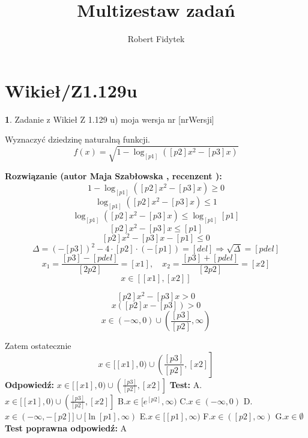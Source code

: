 \documentclass[12pt, a4paper]{article}
\title{Multizestaw zadań}
\author{Robert Fidytek}
\date{}
\theoremstyle{definition} %
\newtheorem{zad}{}
\newcommand{\kategoria}[1]{\section{#1}} %
\newcommand{\zadStart}[1]{\begin{zad}#1\newline} %
\newcommand{\zadStop}{\end{zad}}   %
\newcommand{\rozwStart}[2]{\noindent \textbf{Rozwiązanie (autor #1 , recenzent #2): }\newline} %
\newcommand{\rozwStop}{\newline}                                            %
\newcommand{\odpStart}{\noindent \textbf{Odpowiedź:}\newline}    %
\newcommand{\odpStop}{\newline}                                             %
\newcommand{\testStart}{\noindent \textbf{Test:}\newline} %
\newcommand{\testStop}{\newline} %
\newcommand{\kluczStart}{\noindent \textbf{Test poprawna odpowiedź:}\newline} %
\newcommand{\kluczStop}{\newline} %
\begin{document}
\maketitle


\kategoria{Wikieł/Z1.129u}
\zadStart{Zadanie z Wikieł Z 1.129 u) moja wersja nr [nrWersji]}

Wyznaczyć dziedzinę naturalną funkcji.
$$f(x)=\sqrt{1-\log_{[p1]}([p2]x^{2}-[p3]x)}$$
\zadStop

\rozwStart{Maja Szabłowska}{}
$$1-\log_{[p1]}([p2]x^{2}-[p3]x)\geq0$$
$$\log_{[p1]}([p2]x^{2}-[p3]x)\leq1$$
$$\log_{[p1]}([p2]x^{2}-[p3]x)\leq\log_{[p1]}[p1]$$
$$[p2]x^{2}-[p3]x\leq[p1]$$
$$[p2]x^{2}-[p3]x-[p1]\leq0$$
$$\Delta=(-[p3])^{2}-4\cdot[p2]\cdot(-[p1])=[del] \Rightarrow \sqrt{\Delta}=[pdel]$$
$$x_{1}=\frac{[p3]-[pdel]}{[2p2]}=[x1], \quad x_{2}=\frac{[p3]+[pdel]}{[2p2]}=[x2]$$
$$x\in[[x1],[x2]]$$

$$[p2]x^{2}-[p3]x>0$$
$$x([p2]x-[p3])>0$$
$$x\in\left(-\infty,0\right)\cup\left(\frac{[p3]}{[p2]},\infty\right)$$

Zatem ostatecznie
$$x\in[[x1],0)\cup\left(\frac{[p3]}{[p2]},[x2]\right]$$
\rozwStop
\odpStart
$x\in[[x1],0)\cup\left(\frac{[p3]}{[p2]},[x2]\right]$
\odpStop
\testStart
A.$x\in[[x1],0)\cup\left(\frac{[p3]}{[p2]},[x2]\right]$
B.$x\in[e^{[p2]},\infty)$
C.$x\in(-\infty, 0)$
D.$x\in(-\infty, -[p2]] \cup [\ln[p1],\infty)$
E.$x\in[[p1],\infty)$
F.$x\in([p2],\infty)$
G.$x\in\emptyset$
\testStop
\kluczStart
A
\kluczStop
\end{document}
